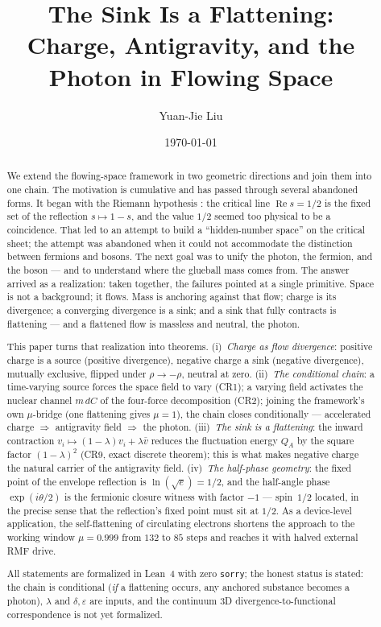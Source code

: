 \documentclass[aps,prd,preprint,superscriptaddress,amsmath,amssymb]{revtex4-2}
\begin{document}
\title{The Sink Is a Flattening:\\
Charge, Antigravity, and the Photon in Flowing Space}

\author{Yuan-Jie Liu}

\date{\today}

\begin{abstract}
We extend the flowing-space framework in two geometric directions and
join them into one chain.  The motivation is cumulative and has passed
through several abandoned forms.  It began with the Riemann hypothesis
\cite{riemann1859ueber}: the critical line $\operatorname{Re}s=1/2$ is
the fixed set of the reflection $s\mapsto 1-s$, and the value $1/2$
seemed too physical to be a coincidence.  That led to an attempt to
build a ``hidden-number space'' on the critical sheet; the attempt was
abandoned when it could not accommodate the distinction between fermions
and bosons.  The next goal was to unify the photon, the fermion, and the
boson --- and to understand where the glueball mass comes from.  The
answer arrived as a realization: taken together, the failures pointed at
a single primitive.  Space is not a background; it flows.  Mass is
anchoring against that flow; charge is its divergence; a converging
divergence is a sink; and a sink that fully contracts is flattening ---
and a flattened flow is massless and neutral, the photon.

This paper turns that realization into theorems.  (i)~\emph{Charge as
flow divergence}: positive charge is a source (positive divergence),
negative charge a sink (negative divergence), mutually exclusive,
flipped under $\rho\to-\rho$, neutral at zero.  (ii)~\emph{The
conditional chain}: a time-varying source forces the space field to vary
(CR1); a varying field activates the nuclear channel $m\,dC$ of the
four-force decomposition (CR2); joining the framework's own $\mu$-bridge
(one flattening gives $\mu=1$), the chain closes conditionally ---
accelerated charge $\Rightarrow$ antigravity field $\Rightarrow$ the
photon.  (iii)~\emph{The sink is a flattening}: the inward contraction
$v_i\mapsto(1-\lambda)v_i+\lambda\bar v$ reduces the fluctuation energy
$Q_A$ by the square factor $(1-\lambda)^2$ (CR9, exact discrete
theorem); this is what makes negative charge the natural carrier of the
antigravity field.  (iv)~\emph{The half-phase geometry}: the fixed point
of the envelope reflection is $\ln(\sqrt e)=1/2$, and the half-angle
phase $\exp(i\theta/2)$ is the fermionic closure witness with factor
$-1$ --- spin~$1/2$ located, in the precise sense that the reflection's
fixed point must sit at $1/2$.  As a device-level application, the
self-flattening of circulating electrons shortens the approach to the
working window $\mu=0.999$ from $132$ to $85$ steps and reaches it with
halved external RMF drive.

All statements are formalized in Lean~4 with zero \texttt{sorry}; the
honest status is stated: the chain is conditional (\emph{if} a
flattening occurs, any anchored substance becomes a photon), $\lambda$
and $\delta,\varepsilon$ are inputs, and the continuum 3D
divergence-to-functional correspondence is not yet formalized.
\end{abstract}
\end{document}

